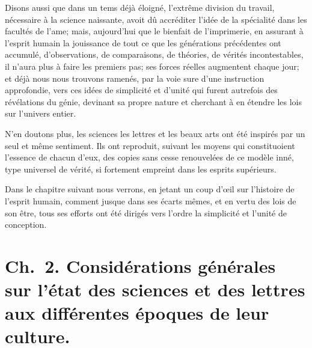\documentclass[11pt,a4paper]{article}
\begin{document}
Disons aussi que dans un tems déjà éloigné, l'extrême division du
travail, nécessaire à la science naissante, avoit dû accréditer l'idée
de la spécialité dans les facultés de  l'ame; mais,
aujourd'hui que le bienfait de l'imprimerie, en assurant à l'esprit
humain la jouissance de tout ce que les générations précédentes ont
accumulé, d'observations, de comparaisons, de théories, de vérités
incontestables, il n'aura plus à  faire les premiers
pas; ses forces réelles augmentent \struck{\ill{}} chaque jour; et
déjà nous nous trouvons ramenés, par la voie sure d'une instruction
approfondie, vers ces idées de simplicité et d'unité qui furent
autrefois des \ill{} révélations du génie,  devinant sa propre nature et cherchant à en étendre les lois
sur l'univers entier.

 N'en doutons plus,  les sciences les lettres et les beaux arts ont été
inspirés par un seul et même sentiment. Ils ont reproduit, suivant les
moyens qui constituoient l'essence de chacun d'eux, des copies sans
cesse renouvelées de ce modèle inné, type universel de vérité, si
fortement empreint dans les esprits supérieurs.

Dans le chapitre suivant nous  verrons, en jetant un
coup d'œil sur l'histoire de l'esprit humain,  comment jusque dans ses écarts mêmes, et en vertu des lois de
son être, tous ses efforts ont été dirigés vers l'ordre la simplicité
et l'unité de conception.

\section{Ch.~2. Considérations générales sur l'état des sciences et des lettres aux différentes époques de leur culture.}
\end{document}
